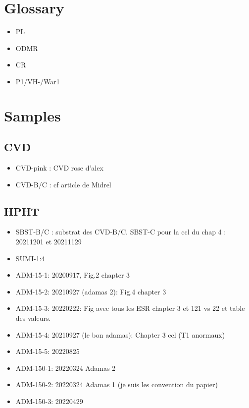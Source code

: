 \documentclass[a4paper]{article}
\begin{document}
\section{Glossary}
\begin{itemize}
\item PL
\item ODMR
\item CR
\item P1/VH-/War1
\end{itemize}
\section{Samples}
\subsection{CVD}
\begin{itemize}
\item CVD-pink : CVD rose d'alex
\item CVD-B/C : cf article de Midrel
\end{itemize}
\subsection{HPHT}
\begin{itemize}
\item SBST-B/C : substrat des CVD-B/C. SBST-C pour la ccl du chap 4 : 20211201 et 20211129
\item SUMI-1:4
\item ADM-15-1: 20200917, Fig.2 chapter 3
\item ADM-15-2: 20210927 (adamas 2): Fig.4 chapter 3
\item ADM-15-3: 20220222: Fig avec tous les ESR chapter 3 et 121 vs 22 et table des valeurs.
\item ADM-15-4: 20210927 (le bon adamas): Chapter 3 ccl (T1 anormaux)
\item ADM-15-5: 20220825
\item ADM-150-1: 20220324 Adamas 2
\item ADM-150-2: 20220324 Adamas 1 (je suis les convention du papier)
\item ADM-150-3: 20220429
\end{itemize}
\end{document}
